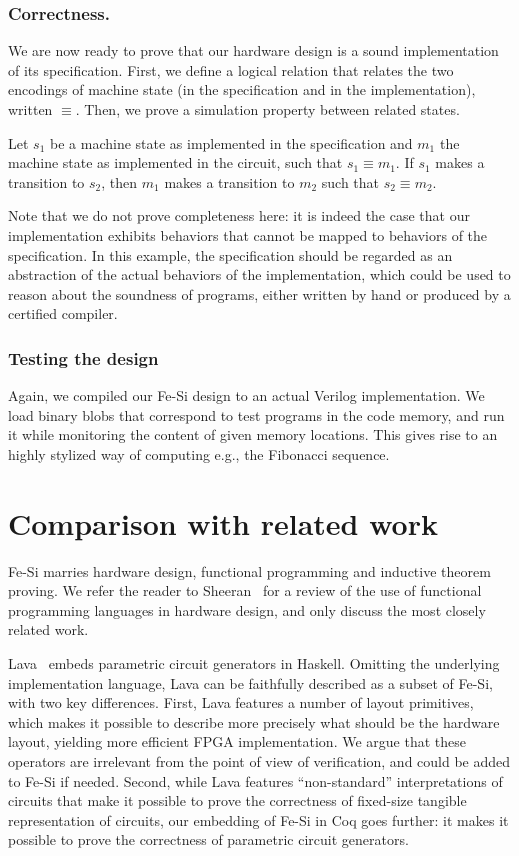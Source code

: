 \documentclass{llncs}
\begin{document}
\subsubsection{Correctness.} We are now ready to prove that our
hardware design is a sound implementation of its specification. 
%
First, we define a logical relation that relates the two
encodings of machine state (in the specification and in the
implementation), written $\equiv$. 
%
Then, we prove a simulation property between related states.
\begin{theorem}
  Let $s_1$ be a machine state as implemented in the specification and
  $m_1$ the machine state as implemented in the circuit, such that
  $s_1 \equiv m_1$.
%
  If $s_1$ makes a transition to $s_2$, then $m_1$ makes a transition
  to $m_2$ such that $s_2 \equiv m_2$.
\end{theorem}
Note that we do not prove completeness here: it is indeed the case
that our implementation exhibits behaviors that cannot be mapped to
behaviors of the specification. 
%
In this example, the specification should be regarded as an
abstraction of the actual behaviors of the implementation, which could
be used to reason about the soundness of programs, either written by
hand or produced by a certified compiler.
%

\subsubsection{Testing the design}
Again, we compiled our Fe-Si design to an actual Verilog
implementation. We load binary blobs that correspond to test programs
in the code memory, and run it while monitoring the content of given
memory locations. This gives rise to an highly stylized way of
computing e.g., the Fibonacci sequence.

\section{Comparison with related work}\label{sec:rw}
Fe-Si marries hardware design, functional programming and inductive
theorem proving.
%
We refer the reader to Sheeran~\cite{DBLP:journals/jucs/Sheeran05} for
a review of the use of functional programming languages in hardware
design, and only discuss the most closely related work.

\medskip

Lava~\cite{Bjesse98lava:hardware} embeds parametric circuit generators
in Haskell. 
%
Omitting the underlying implementation language, Lava can be
faithfully described as a subset of Fe-Si, with two key differences.
%
First, Lava features a number of layout primitives, which makes it
possible to describe more precisely what should be the hardware
layout, yielding more efficient FPGA implementation. We argue that
these operators are irrelevant from the point of view of verification,
and could be added to Fe-Si if needed.
%
Second, while Lava features ``non-standard'' interpretations of
circuits that make it possible to prove the correctness of fixed-size
tangible representation of circuits, our embedding of Fe-Si in Coq
goes further: it makes it possible to prove the correctness of
parametric circuit generators.
\end{document}
